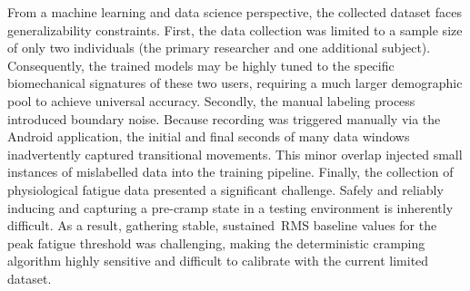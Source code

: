 From a machine learning and data science perspective, the collected dataset faces generalizability constraints. First, the data collection was limited to a sample size of only two individuals (the primary researcher 
and one additional subject). Consequently, the trained models may be highly tuned to the specific biomechanical signatures of these two users, requiring a much larger demographic pool to achieve universal accuracy.
Secondly, the manual labeling process introduced boundary noise. Because recording was triggered manually via the Android application, the initial and final seconds of many data windows inadvertently captured 
transitional movements. This minor overlap injected small instances of mislabelled data into the training pipeline.
Finally, the collection of physiological fatigue data presented a significant challenge. Safely and reliably inducing and capturing a pre-cramp state in a testing environment is inherently difficult. 
As a result, gathering stable, sustained~\gls{RMS} baseline values for the peak fatigue threshold was challenging, making the deterministic cramping algorithm highly sensitive and difficult to calibrate 
with the current limited dataset.

